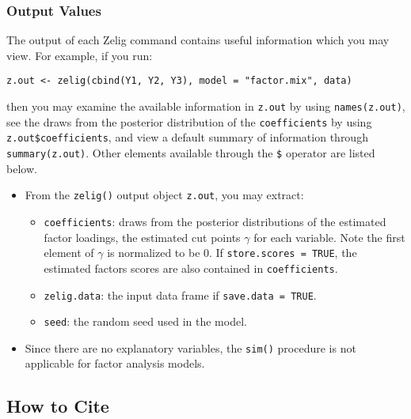 \subsubsection{Output Values}

The output of each Zelig command contains useful information which you may
view. For example, if you run:
\begin{verbatim}
z.out <- zelig(cbind(Y1, Y2, Y3), model = "factor.mix", data)
\end{verbatim}

\noindent then you may examine the available information in \texttt{z.out} by
using \texttt{names(z.out)}, see the draws from the posterior distribution of
the \texttt{coefficients} by using \texttt{z.out\$coefficients}, and view a default
summary of information through \texttt{summary(z.out)}. Other elements
available through the \texttt{\$} operator are listed below.

\begin{itemize}
\item From the \texttt{zelig()} output object \texttt{z.out}, you may extract:

\begin{itemize}
\item \texttt{coefficients}: draws from the posterior distributions
of the estimated factor loadings, the estimated cut points $\gamma$ for each
variable. Note the first element of $\gamma$ is normalized to be 0. If 
\texttt{store.scores = TRUE}, the estimated factors scores are also contained in 
\texttt{coefficients}.

   \item {\tt zelig.data}: the input data frame if {\tt save.data = TRUE}.  
\item \texttt{seed}: the random seed used in the model.   

\end{itemize}

\item Since there are no explanatory variables, the \texttt{sim()} procedure is
not applicable for factor analysis models.

\end{itemize}

\subsection* {How to Cite} 



